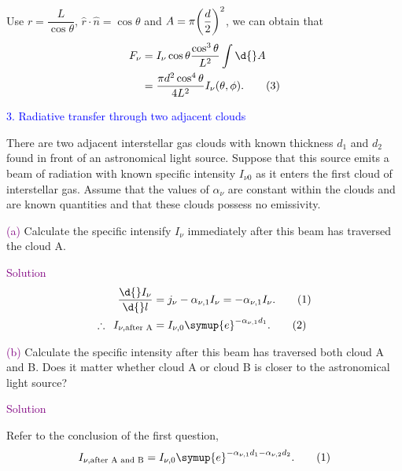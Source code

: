 \documentclass[UTF8, 12pt, a4paper, oneside, twocolumn, fontset=none]{ctexart}
\begin{document}
Use $r=\dfrac{L}{\cos{\theta}}$, $\hat{r}\cdot{}\hat{n}=\cos{\theta}$ and $A=\pi\mleft(\dfrac{d}{2}\mright)^{2}$, we can obtain that
\begin{align}
F_{\nu}&=I_{\nu}\cos{\theta}\frac{\cos^{3}{\theta}}{L^{2}}\int{}\d{}A\notag\\
&=\frac{\pi{}d^{2}\cos^{4}{\theta}}{4L^{2}}I_{\nu}\mleft(\theta,\phi\mright).\tag{3}
\end{align}

\hspace*{\fill}

\noindent\textcolor{blue}{3. Radiative transfer through two adjacent clouds}

\noindent There are two adjacent interstellar gas clouds with known thickness $d_{1}$ and $d_{2}$ found in front of an astronomical light source. Suppose that this source emits a beam of radiation with known specific intensity $I_{\nu0}$ as it enters the first cloud of interstellar gas. Assume that the values of $\alpha_{\nu}$ are constant within the clouds and are known quantities and that these clouds possess no emissivity.

\hspace*{\fill}

\noindent\textcolor{purple}{(a)} Calculate the specific intensify $I_{\nu}$ immediately after this beam has traversed the cloud A.

\hspace*{\fill}

\noindent\textcolor{purple}{Solution}
\begin{align}
\frac{\d{}I_{\nu}}{\d{}l}&=j_{\nu}-\alpha_{\nu, 1}I_{\nu}=-\alpha_{\nu, 1}I_{\nu}.\tag{1}\\
\therefore\enspace{}I_{\nu,\text{after A}}&=I_{\nu, 0}\symup{e}^{-\alpha_{\nu, 1}d_{1}}.\tag{2}
\end{align}

\hspace*{\fill}

\noindent\textcolor{purple}{(b)} Calculate the specific intensity after this beam has traversed both cloud A and B. Does it matter whether cloud A or cloud B is closer to the astronomical light source?

\hspace*{\fill}

\noindent\textcolor{purple}{Solution}

Refer to the conclusion of the first question,
\begin{equation}
I_{\nu,\text{after A and B}}=I_{\nu, 0}\symup{e}^{-\alpha_{\nu, 1}d_{1}-\alpha_{\nu, 2}d_{2}}.\tag{1}
\end{equation}
\end{document}
